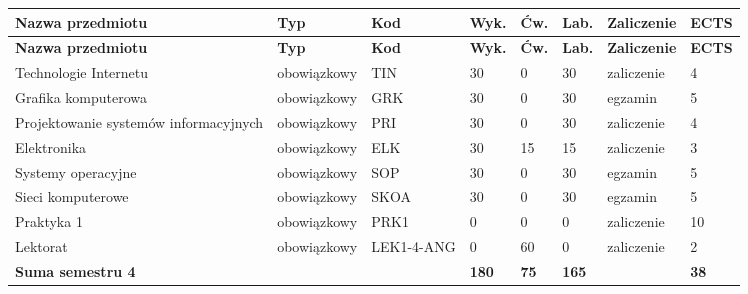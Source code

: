 \documentclass[12pt,a4paper]{article}
\newcommand{\thdrule}{\noalign{\global\setlength{\extrarowheight}{0pt}}}
\newcommand{\thdend}{\noalign{\global\setlength{\extrarowheight}{4pt}}}
\begin{document}
{\scriptsize
\begin{longtable}{>{\RaggedRight}m{5.0cm}m{1.9cm}m{0.75cm}m{0.85cm}m{0.85cm}m{0.85cm}m{1.45cm}m{0.9cm}}
\thdrule\toprule
\rowcolor{pjatkRed}
{\color{white}\footnotesize\textbf{\vphantom{Ag}Nazwa przedmiotu}} & {\color{white}\footnotesize\textbf{\vphantom{Ag}Typ}} & {\color{white}\footnotesize\textbf{\vphantom{Ag}Kod}} & {\color{white}\footnotesize\textbf{\vphantom{Ag}Wyk.}} & {\color{white}\footnotesize\textbf{\vphantom{Ag}Ćw.}} & {\color{white}\footnotesize\textbf{\vphantom{Ag}Lab.}} & {\color{white}\footnotesize\textbf{\vphantom{Ag}Zaliczenie}} & {\color{white}\footnotesize\textbf{\vphantom{Ag}ECTS}} \\
\midrule\thdend
\endfirsthead
\thdrule\toprule
\rowcolor{pjatkRed}
{\color{white}\footnotesize\textbf{\vphantom{Ag}Nazwa przedmiotu}} & {\color{white}\footnotesize\textbf{\vphantom{Ag}Typ}} & {\color{white}\footnotesize\textbf{\vphantom{Ag}Kod}} & {\color{white}\footnotesize\textbf{\vphantom{Ag}Wyk.}} & {\color{white}\footnotesize\textbf{\vphantom{Ag}Ćw.}} & {\color{white}\footnotesize\textbf{\vphantom{Ag}Lab.}} & {\color{white}\footnotesize\textbf{\vphantom{Ag}Zaliczenie}} & {\color{white}\footnotesize\textbf{\vphantom{Ag}ECTS}} \\
\midrule\thdend
\endhead
\rowcolor{tableRowLight} Technologie Internetu & {\scriptsize obowiązkowy} & TIN & 30 & 0 & 30 & {\scriptsize zaliczenie} & 4 \\
\rowcolor{tableRowAlt} Grafika komputerowa & {\scriptsize obowiązkowy} & GRK & 30 & 0 & 30 & {\scriptsize egzamin} & 5 \\
\rowcolor{tableRowLight} Projektowanie systemów informacyjnych & {\scriptsize obowiązkowy} & PRI & 30 & 0 & 30 & {\scriptsize zaliczenie} & 4 \\
\rowcolor{tableRowAlt} Elektronika & {\scriptsize obowiązkowy} & ELK & 30 & 15 & 15 & {\scriptsize zaliczenie} & 3 \\
\rowcolor{tableRowLight} Systemy operacyjne & {\scriptsize obowiązkowy} & SOP & 30 & 0 & 30 & {\scriptsize egzamin} & 5 \\
\rowcolor{tableRowAlt} Sieci komputerowe & {\scriptsize obowiązkowy} & SKOA & 30 & 0 & 30 & {\scriptsize egzamin} & 5 \\
\rowcolor{tableRowLight} Praktyka 1 & {\scriptsize obowiązkowy} & PRK1 & 0 & 0 & 0 & {\scriptsize zaliczenie} & 10 \\
\rowcolor{tableRowAlt} Lektorat & {\scriptsize obowiązkowy} & LEK1-4-ANG & 0 & 60 & 0 & {\scriptsize zaliczenie} & 2 \\
\midrule[\heavyrulewidth]
\rowcolor{tableSummary} \textbf{Suma semestru 4} & & & \textbf{180} & \textbf{75} & \textbf{165} & & \textbf{38} \\
\bottomrule
\end{longtable}}
\end{document}

